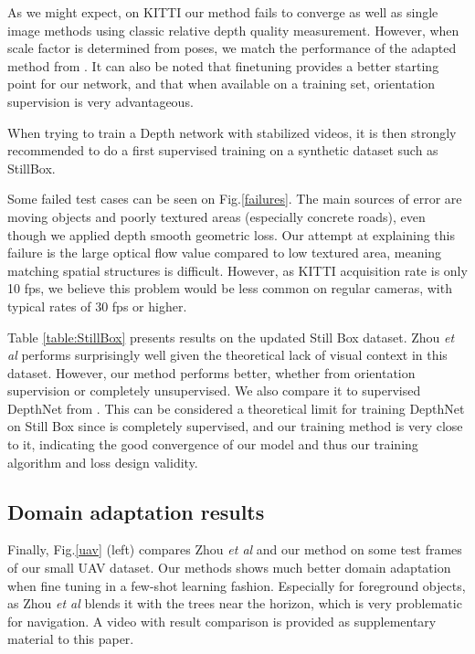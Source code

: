 \documentclass[runningheads]{llncs}
\def\etal{\emph{et al}\:}
\begin{document}
As we might expect, on KITTI our method fails to converge as well as single image methods using classic relative depth quality measurement. However, when scale factor is determined from poses, we match the performance of the adapted method from \cite{zhou2017unsupervised}. It can also be noted that finetuning provides a better starting point for our network, and that when available on a training set, orientation supervision is very advantageous.

When trying to train a Depth network with stabilized videos, it is then strongly recommended to do a first supervised training on a synthetic dataset such as StillBox.

Some failed test cases can be seen on Fig.\ref{failures}. The main sources of error are moving objects and poorly textured
areas (especially concrete roads), even though we applied depth smooth geometric loss. Our attempt at explaining this failure is the large optical flow value compared to low textured area, meaning matching spatial structures is difficult. However, as KITTI acquisition rate is only 10 fps, we believe this problem would be less common on regular cameras, with typical rates of 30 fps or higher.


Table \ref{table:StillBox} presents results on the updated Still Box dataset. Zhou \etal \cite{zhou2017unsupervised} performs surprisingly well given the theoretical lack of visual context in this dataset. However, our method performs better, whether from orientation supervision or completely unsupervised. We also compare it to supervised DepthNet from \cite{isprs-annals-IV-2-W3-67-2017}. This can be considered a theoretical limit for training DepthNet on Still Box since
\cite{isprs-annals-IV-2-W3-67-2017}
is completely supervised, and our training method is very close to it, indicating the good convergence of our model and thus our training algorithm and loss design validity.

\subsection{Domain adaptation results}
Finally, Fig.\ref{uav} (left) compares Zhou \etal \cite{zhou2017unsupervised} and our method on some test frames of our small UAV dataset. Our methods shows much better domain adaptation when fine tuning in a few-shot learning fashion. Especially for foreground objects, as Zhou \etal \cite{zhou2017unsupervised} blends it with the trees near the horizon, which is very problematic for navigation. A video with result comparison is
provided as supplementary material to this paper.
\end{document}

